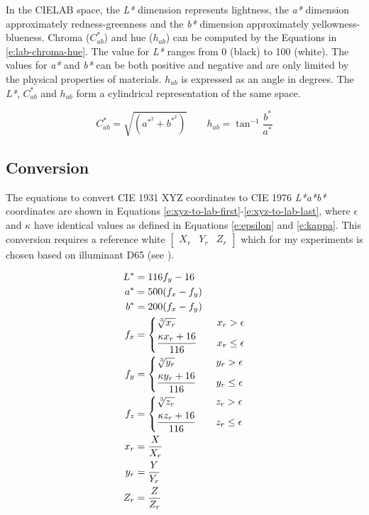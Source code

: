 In the CIELAB space, the \emph{L*} dimension represents lightness, the
\emph{a*} dimension approximately redness-greenness and the \emph{b*}
dimension approximately yellowness-blueness. Chroma ($C^*_{ab}$) and
hue ($h_{ab}$) can be computed by the Equations in
\ref{e:lab-chroma-hue}. The value for \emph{L*} ranges from 0 (black)
to 100 (white). The values for \emph{a*} and \emph{b*} can be both
positive and negative and are only limited by the physical properties
of materials.  $h_{ab}$ is expressed as an angle in degrees. The
\emph{L*}, $C^*_{ab}$ and $h_{ab}$ form a cylindrical representation
of the same space.

\begin{equation}
C^*_{ab} = \sqrt{\left(a^{*^2} + b^{*^2} \right)} \qquad h_{ab} = \tan^{-1} \frac{b^*}{a^*}
\label{e:lab-chroma-hue}
\end{equation}

\subsection{Conversion}

The equations to convert CIE 1931 XYZ coordinates to CIE 1976
\emph{L*a*b*} coordinates are shown in Equations
\ref{e:xyz-to-lab-first}-\ref{e:xyz-to-lab-last}, where $\epsilon$ and
$\kappa$ have identical values as defined in Equations \ref{e:epsilon}
and \ref{e:kappa}. This conversion requires a reference white
$\begin{bmatrix}X_r & Y_r & Z_r\end{bmatrix}$ which for my experiments
is chosen based on illuminant D65 (see ).

\begin{align}
L^{*}& = 116f_y - 16
\label{e:xyz-to-lab-first} \\
a^{*}& = 500(f_x - f_y) \\
b^{*}& = 200(f_x - f_y) \\
f_x& = \left\{
\begin{aligned}
&\sqrt[\leftroot{-1}\uproot{2}3]{x_r} & \quad x_r > \epsilon \\
&\frac{\kappa x_r + 16}{116} & \quad x_r \leq \epsilon
\end{aligned}
\right. \\
f_y& = \left\{
\begin{aligned}
&\sqrt[\leftroot{-1}\uproot{2}3]{y_r} & \quad y_r > \epsilon \\
&\frac{\kappa y_r + 16}{116} & \quad y_r \leq \epsilon
\end{aligned}
\right. \\
f_z& = \left\{
\begin{aligned}
&\sqrt[\leftroot{-1}\uproot{2}3]{z_r} & \quad z_r > \epsilon \\
&\frac{\kappa z_r + 16}{116} & \quad z_r \leq \epsilon
\end{aligned}
\right. \\
x_r& = \frac{X}{X_r} \\
y_r& = \frac{Y}{Y_r} \\
Z_r& = \frac{Z}{Z_r}
\label{e:xyz-to-lab-last}
\end{align}


